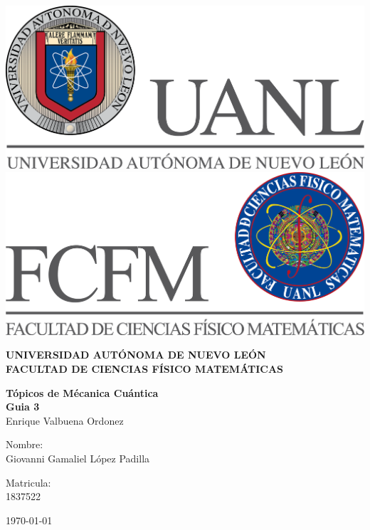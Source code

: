 \begin{titlepage}
    \begin{center}
    \includegraphics[scale=0.40]{../../Logos/uanl.png} 
    \hspace{2.5cm}
    \includegraphics[scale=0.40]{../../Logos/fcfm.png}
    \end{center}
    \vspace{2cm}
    \begin{center}
    \textbf{
    UNIVERSIDAD AUTÓNOMA DE NUEVO LEÓN\\
    FACULTAD DE CIENCIAS
        FÍSICO MATEMÁTICAS}\\
    \vspace*{2cm}
    \begin{large}
    \vspace{1cm}
    \large{\textbf{Tópicos de Mécanica Cuántica}}\\
    \textbf{Guia 3}\\
    Enrique Valbuena Ordonez\\
    \end{large}
    \vspace{3.5cm}
    \begin{minipage}{0.6\linewidth}
    \vspace{0.5cm}
    \changefontsizes{14pt}
    Nombre:\\
    Giovanni Gamaliel López Padilla\\
    \end{minipage}
    \begin{minipage}{0.2\linewidth}
    \changefontsizes{14pt}
    Matricula:\\
    1837522
    \end{minipage}
    \end{center}
    \vspace{4cm}
    \begin{flushright}
    \today
    \end{flushright}
    \end{titlepage}